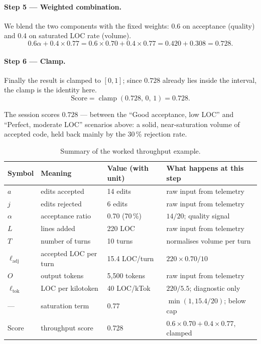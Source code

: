 \documentclass[11pt,a4paper]{article}
\newcommand{\clamp}[3]{\operatorname{clamp}\!\left(#1,\,#2,\,#3\right)}
\begin{document}
\paragraph{Step 5 --- Weighted combination.}
We blend the two components with the fixed weights: 0.6 on acceptance
(quality) and 0.4 on saturated LOC rate (volume).
\[
  0.6\alpha + 0.4 \times 0.77
  = 0.6 \times 0.70 + 0.4 \times 0.77
  = 0.420 + 0.308
  = 0.728.
\]

\paragraph{Step 6 --- Clamp.}
Finally the result is clamped to $[0,1]$; since $0.728$ already lies inside
the interval, the clamp is the identity here.
\[
  \text{Score} = \clamp{0.728}{0}{1} = 0.728.
\]

The session scores $0.728$ --- between the ``Good acceptance, low LOC''
and ``Perfect, moderate LOC'' scenarios above: a solid, near-saturation
volume of accepted code, held back mainly by the 30\,\% rejection rate.

\begin{table}[h!]
\centering
\caption{Summary of the worked throughput example.}
\label{tab:throughput-worked}
\begin{tabular}{@{}llll@{}}
\toprule
Symbol & Meaning & Value (with unit) & What happens at this step \\
\midrule
$a$ & edits accepted & 14 edits & raw input from telemetry \\
$j$ & edits rejected & 6 edits & raw input from telemetry \\
$\alpha$ & acceptance ratio & 0.70 (70\,\%) & $14/20$; quality signal \\
$L$ & lines added & 220 LOC & raw input from telemetry \\
$T$ & number of turns & 10 turns & normalises volume per turn \\
$\ell_{\text{adj}}$ & accepted LOC per turn & 15.4 LOC/turn & $220 \times 0.70 / 10$ \\
$O$ & output tokens & 5{,}500 tokens & raw input from telemetry \\
$\ell_{\text{tok}}$ & LOC per kilotoken & 40 LOC/kTok & $220/5.5$; diagnostic only \\
--- & saturation term & 0.77 & $\min(1, 15.4/20)$; below cap \\
Score & throughput score & 0.728 & $0.6 \times 0.70 + 0.4 \times 0.77$, clamped \\
\bottomrule
\end{tabular}
\end{table}
\end{document}
